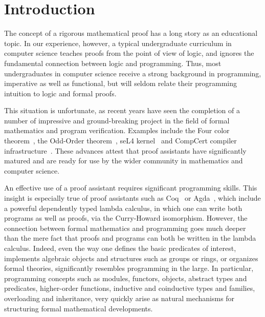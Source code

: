 \documentclass[blockstyle,preprint,nocopyrightspace]{sigplanconf}
\begin{document}
\section{Introduction}
\label{sec:intro}

The concept of a rigorous mathematical proof has a long story as an
educational topic. In our experience, however, a typical undergraduate
curriculum in computer science teaches proofs from the point of view
of logic, and ignores the fundamental connection between logic and
programming. Thus, most undergraduates in computer science receive a
strong background in programming, imperative as well as functional,
but will seldom relate their programming intuition to logic and formal
proofs.

This situation is unfortunate, as recent years have seen the
completion of a number of impressive and ground-breaking project in
the field of formal mathematics and program verification. Examples
include the Four color theorem~\cite{Gonthier:AMS08}, the Odd-Order
theorem~\cite{Gonthier-al:ITP13}, seL4 kernel~\cite{Klein-al:TCS14}
and CompCert compiler infrastructure~\cite{Leroy:POPL06}. These
advances attest that proof assistants have significantly matured and
are ready for use by the wider community in mathematics and computer
science.

An effective use of a proof assistant requires significant programming
skills. This insight is especially true of proof assistants such as
Coq~\cite{Coq-manual} or Agda~\cite{Norell:PhD}, which include a
powerful dependently typed lambda calculus, in which one can write
both programs as well as proofs, via the Curry-Howard isomorphism.
However, the connection between formal mathematics and programming
goes much deeper than the mere fact that proofs and programs can both
be written in the lambda calculus. Indeed, even the way one defines
the basic predicates of interest, implements algebraic objects and
structures such as groups or rings, or organizes formal theories,
significantly resembles programming in the large. In particular,
programming concepts such as modules, functors, objects, abstract
types and predicates, higher-order functions, inductive and
coinductive types and families, overloading and inheritance, very
quickly arise as natural mechanisms for structuring formal
mathematical developments.
\end{document}
